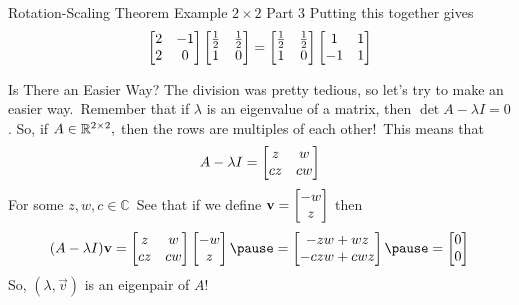 \documentclass[xcoler=dvipsnames, aspectratio=169]{beamer}
\newcommand{\C}{\mathbb{C}}
\begin{document}
    \begin{frame}{Rotation-Scaling Theorem Example $2\times 2$ Part 3}
        Putting this together gives\pause
        \[
            \begin{bmatrix}
                2 & -1 \\
                2 & 0
            \end{bmatrix}\begin{bmatrix}
                \frac{1}{2} & \frac{1}{2}\\
                1 & 0
            \end{bmatrix} = \begin{bmatrix}
                \frac{1}{2} & \frac{1}{2}\\
                1 & 0
            \end{bmatrix}\begin{bmatrix}
                1 & 1\\
                -1& 1
            \end{bmatrix}
        \]
    \end{frame}
    \begin{frame}{Is There an Easier Way?}
        The division was pretty tedious, so let's try to make an easier way.\pause\
        Remember that if $\lambda$ is an eigenvalue of a matrix, then $\det{A-\lambda I} = 0$. So, if
        $A\in\mathbb{R}^{2\times 2},$ then the rows are multiples of each other!\pause\ This means that
        \[
            A - \lambda I = \begin{bmatrix}
                z & w\\
                cz&cw
            \end{bmatrix}
        \]
        For some $z,w,c\in\C$\pause\
        See that if we define $\mathbf{v} = \begin{bmatrix}-w\\z\end{bmatrix}$ then\pause\
        \[
            (A-\lambda I)\vec{v} = \bMat{
                z & w\\
                cz&cw
            }\bMat{-w\\z}\pause = \bMat{
                -zw + wz\\
                -czw+cwz
            }\pause = \bMat{
                0\\
                0
            }
        \]\pause
        So, $(\lambda,\vec{v})$ is an eigenpair of $A$!
    \end{frame}
\end{document}
